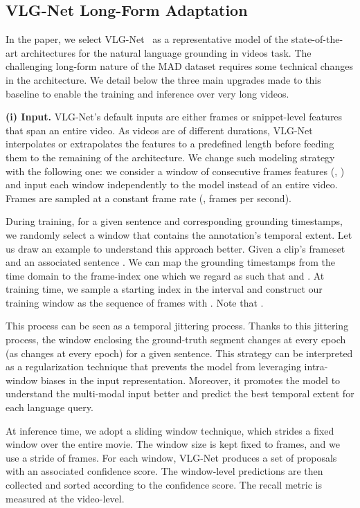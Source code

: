 \documentclass[10pt,twocolumn,letterpaper]{article}
\begin{document}
\subsection{VLG-Net Long-Form Adaptation}
In the paper, we select VLG-Net~\cite{soldan2021vlg} as a representative model of the state-of-the-art architectures for the natural language grounding in videos task. 
The challenging long-form nature of the MAD dataset requires some technical changes in the architecture. We detail below the three main upgrades made to this baseline to enable the training and inference over very long videos. 

\textbf{(i) Input.} VLG-Net's default inputs are either frames or snippet-level features that span an entire video. As videos are of different durations, VLG-Net interpolates or extrapolates the features to a predefined length before feeding them to the remaining of the architecture. We change such modeling strategy with the following one: we consider a window of consecutive frames features (\ie, ) and input each window independently to the model instead of an entire video. 
Frames are sampled at a constant frame rate (\ie,  frames per second).

During training, for a given sentence and corresponding grounding timestamps, we randomly select a window that contains the annotation's temporal extent. Let us draw an example to understand this approach better. Given a clip's frameset  and an associated sentence . We can map the grounding timestamps from the time domain to the frame-index one which we regard as  such that  and . At training time, we sample a starting index  in the interval  and construct our training window as the sequence of frames  with . Note that .

This process can be seen as a temporal jittering process.
Thanks to this jittering process, the window enclosing the ground-truth segment changes at every epoch (as  changes at every epoch) for a given sentence. This strategy can be interpreted as a regularization technique that prevents the model from leveraging intra-window biases in the input representation. Moreover, it promotes the model to understand the multi-modal input better and predict the best temporal extent for each language query. 

At inference time, we adopt a sliding window technique, which strides a fixed window over the entire movie. The window size is kept fixed to  frames, and we use a stride of  frames.
For each window, VLG-Net produces a set of proposals with an associated confidence score.
The window-level predictions are then collected and sorted according to the confidence score. The recall metric is measured at the video-level. 
\end{document}

